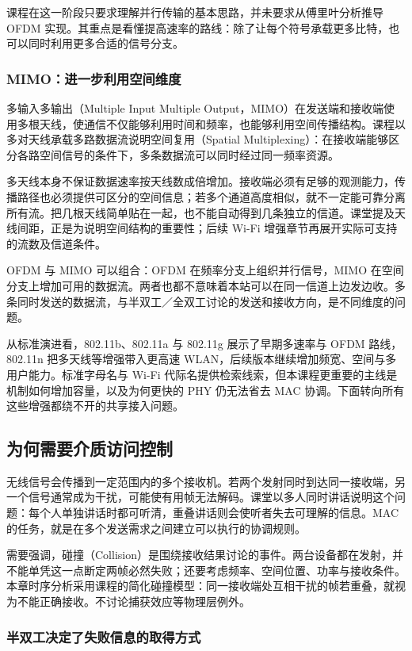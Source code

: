 课程在这一阶段只要求理解并行传输的基本思路，并未要求从傅里叶分析推导 OFDM 实现。其重点是看懂提高速率的路线：除了让每个符号承载更多比特，也可以同时利用更多合适的信号分支。

\subsubsection{MIMO：进一步利用空间维度}

多输入多输出（Multiple Input Multiple Output，MIMO）在发送端和接收端使用多根天线，使通信不仅能够利用时间和频率，也能够利用空间传播结构。课程以多对天线承载多路数据流说明空间复用（Spatial Multiplexing）：在接收端能够区分各路空间信号的条件下，多条数据流可以同时经过同一频率资源。

多天线本身不保证数据速率按天线数成倍增加。接收端必须有足够的观测能力，传播路径也必须提供可区分的空间信息；若多个通道高度相似，就不一定能可靠分离所有流。把几根天线简单贴在一起，也不能自动得到几条独立的信道。课堂提及天线间距，正是为说明空间结构的重要性；后续 Wi-Fi 增强章节再展开实际可支持的流数及信道条件。

OFDM 与 MIMO 可以组合：OFDM 在频率分支上组织并行信号，MIMO 在空间分支上增加可用的数据流。两者也都不意味着本站可以在同一信道上边发边收。多条同时发送的数据流，与半双工／全双工讨论的发送和接收方向，是不同维度的问题。

从标准演进看，802.11b、802.11a 与 802.11g 展示了早期多速率与 OFDM 路线，802.11n 把多天线等增强带入更高速 WLAN，后续版本继续增加频宽、空间与多用户能力。标准字母名与 Wi-Fi 代际名提供检索线索，但本课程更重要的主线是机制如何增加容量，以及为何更快的 PHY 仍无法省去 MAC 协调。下面转向所有这些增强都绕不开的共享接入问题。


\subsection{为何需要介质访问控制}

无线信号会传播到一定范围内的多个接收机。若两个发射同时到达同一接收端，另一个信号通常成为干扰，可能使有用帧无法解码。课堂以多人同时讲话说明这个问题：每个人单独讲话时都可听清，重叠讲话则会使听者失去可理解的信息。MAC 的任务，就是在多个发送需求之间建立可以执行的协调规则。

需要强调，碰撞（Collision）是围绕接收结果讨论的事件。两台设备都在发射，并不能单凭这一点断定两帧必然失败；还要考虑频率、空间位置、功率与接收条件。本章时序分析采用课程的简化碰撞模型：同一接收端处互相干扰的帧若重叠，就视为不能正确接收。不讨论捕获效应等物理层例外。

\subsubsection{半双工决定了失败信息的取得方式}

